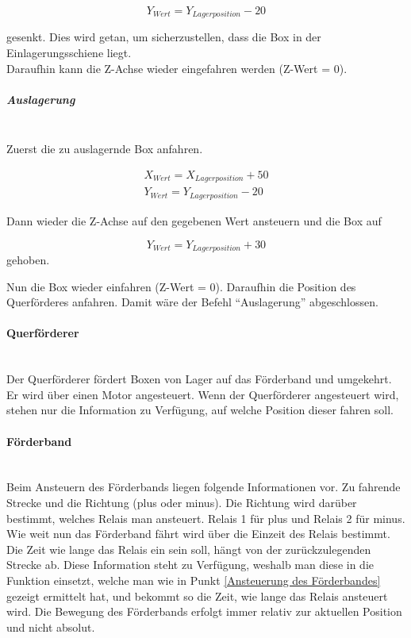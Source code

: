     \vspace{-6mm}
    \begin{equation*}
        Y_{Wert} = Y_{Lagerposition} - 20
    \end{equation*}

    gesenkt. Dies wird getan, um sicherzustellen, dass die Box in der Einlagerungsschiene liegt. \\
    Daraufhin kann die Z-Achse wieder eingefahren werden (Z-Wert = 0). 

    \subparagraph{Auslagerung} \mbox{} \\
    Zuerst die zu auslagernde Box anfahren. 

    \vspace{-6mm}

    \begin{equation*}
        \begin{split}
                X_{Wert} = X_{Lagerposition} + 50
                \\
                Y_{Wert} = Y_{Lagerposition} - 20  
        \end{split} 
    \end{equation*}

    Dann wieder die Z-Achse auf den gegebenen Wert ansteuern und die Box auf

    \vspace{-6mm}
    \begin{equation*}
        Y_{Wert} = Y_{Lagerposition} + 30
    \end{equation*}
    gehoben.

    Nun die Box wieder einfahren (Z-Wert = 0). Daraufhin die Position des Querförderes anfahren. Damit wäre der Befehl \enquote{Auslagerung} abgeschlossen.


    \paragraph{Querförderer} \mbox{} \\ 
    Der Querförderer fördert Boxen von Lager auf das Förderband und umgekehrt. Er wird über einen Motor angesteuert. Wenn der Querförderer angesteuert wird, stehen nur die Information zu Verfügung, auf welche Position dieser fahren soll.

    \paragraph{Förderband} \mbox{} \\
    Beim Ansteuern des Förderbands liegen folgende Informationen vor. Zu fahrende Strecke und die Richtung (plus oder minus). Die Richtung wird darüber bestimmt, welches Relais man ansteuert. Relais 1 für plus und Relais 2 für minus. Wie weit nun das Förderband fährt wird über die Einzeit des Relais bestimmt. Die Zeit wie lange das Relais ein sein soll, hängt von der zurückzulegenden Strecke ab. Diese Information steht zu Verfügung, weshalb man diese in die Funktion einsetzt, welche man wie in Punkt \ref{Ansteuerung des Förderbandes} gezeigt ermittelt hat, und bekommt so die Zeit, wie lange das Relais ansteuert wird. Die Bewegung des Förderbands erfolgt immer relativ zur aktuellen Position und nicht absolut. 



